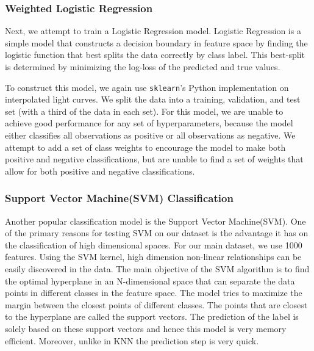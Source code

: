 \documentclass{article}
\begin{document}



\subsubsection{Weighted Logistic Regression}
Next, we attempt to train a Logistic Regression model. Logistic Regression is a simple model that constructs a decision boundary in feature space by finding the logistic function that best splits the data correctly by class label. This best-split is determined by minimizing the log-loss of the predicted and true values.

To construct this model, we again use \texttt{sklearn}'s Python implementation on interpolated light curves. We split the data into a training, validation, and test set (with a third of the data in each set). For this model, we are unable to achieve good performance for any set of hyperparameters, because the model either classifies all observations as positive or all observations as negative. We attempt to add a set of class weights to encourage the model to make both positive and negative classifications, but are unable to find a set of weights that allow for both positive and negative classifications.


\subsubsection{Support Vector Machine(SVM) Classification}

Another popular classification model is the Support Vector Machine(SVM). One of the primary reasons for testing SVM on our dataset is the advantage it has on the classification of high dimensional spaces. For our main dataset, we use 1000 features. Using the SVM kernel, high dimension non-linear relationships can be easily discovered in the data. The main objective of the SVM algorithm is to find the optimal hyperplane in an N-dimensional space that can separate the data points in different classes in the feature space. The model tries to maximize the margin between the closest points of different classes. The points that are closest to the hyperplane are called the support vectors. The prediction of the label is solely based on these support vectors and hence this model is very memory efficient. Moreover, unlike in KNN the prediction step is very quick.  
\end{document}
